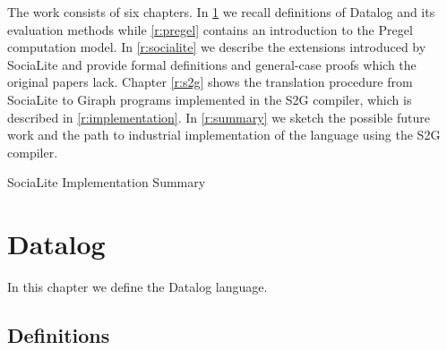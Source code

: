 \documentclass{pracamgr}
\theoremstyle{plain}
\theoremstyle{definition}
\theoremstyle{remark}
\begin{document}
The work consists of six chapters. In \ref{r:datalog} we recall definitions of Datalog and its evaluation methods while \ref{r:pregel} contains an introduction to the Pregel computation model. In \ref{r:socialite} we describe the extensions introduced by SociaLite and provide formal definitions and general-case proofs which the original papers lack. Chapter \ref{r:s2g} shows the translation procedure from SociaLite to Giraph programs implemented in the S2G compiler, which is described in \ref{r:implementation}. In \ref{r:summary} we sketch the possible future work and the path to industrial implementation of the language using the S2G compiler.

\begin{comment}

Blabalizator różnicowy jest podstawowym narzędziem blabalii
fetorycznej.  Dlatego naukowcy z~całego świata prześcigają się
w~próbach efektywnej implementacji.  Opracowana przez prof. Fifaka
teoria fetorów $\sigma$-$\rho$ otwiera w~tej dziedzinie nowe
możliwości.  Wykorzystujemy je w~niniejszej pracy.

Przystępne wprowadzenie do blabalii fetorycznej można znaleŒć w~pracy
Fifaka i~Gryzogrzechotalskiego \cite{ffgg}.  Dlatego w~niniejszym
tekście ograniczymy się do przypomnienia pojęć podstawowych.

Praca składa się z~pięciu rozdziałów i~dodatków.
W~rozdziale~\ref{r:pojecia} przypomniano podstawowe pojęcia blabalii
fetorycznej.  Dotychczasowe próby implementacji blablizatora
różnicowego zestawiono w~rozdziale~\ref{r:losers}.
Rozdział~\ref{r:fifak} przedstawia teorię Fifaka i~wyjaśnia sposób jej
wykorzystania w~implementacji blabalizatora.  W~rozdziale \ref{r:impl}
przedstawiono algorytm blabalizy i~realizujący go program komputerowy.
Ostatni rozdział zawiera przemyślenia dotyczące możliwego wpływu
dostępności efektywnej blabalizy numerycznej na rozwój blabalii
fetorycznej.  W~dodatkach umieszczono najciekawszy fragment programu,
przykładowe dane i~wyniki działania programu.

\end{comment}


SociaLite
Implementation
Summary

\chapter{Datalog}\label{r:datalog}

In this chapter we define the Datalog language.

\section{Definitions}
\end{document}
